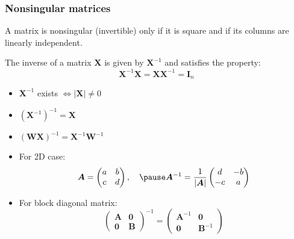 \documentclass[smaller]{beamer}
\newcommand{\?}{\stackrel{?}{=}}
\newcommand{\fr}{\frac}
\begin{document}
\begin{frame}
  \frametitle{Nonsingular matrices}
  \pause

  A matrix is nonsingular (invertible) only if it is square and if its columns are  linearly independent.

  \pause

  The inverse of a matrix $\bm X$ is given by $\bm X^{-1}$ and
  satisfies the property:\pause
 \begin{equation}
    \bm X^{-1}\bm X = \bm X \bm X^{-1} = \bm I_{n}
  \end{equation}
  
\pause

\begin{itemize}
\item $\bm X^{-1}$ exists $\iff |\bm X| \ne 0$ \pause
\item $(\bm X^{-1})^{-1} = \bm X$ \pause
\item $(\bm W\bm X)^{-1} = \bm X^{-1}\bm W^{-1}$ \pause
\item For 2D case:\pause
  \begin{equation}
    \bm A =
    \begin{pmatrix}
      a & b\\ c& d
    \end{pmatrix},\quad\pause \bm{A}^{-1} = \fr1{|\bm A|}
    \begin{pmatrix}
      d & -b \\ -c & a
    \end{pmatrix}
  \end{equation}

\pause
\item For block diagonal matrix:\pause
  \begin{equation}
    \begin{pmatrix}
      \bm A & \bm 0 \\ \bm 0 & \bm B
    \end{pmatrix}^{-1}
 =
 \begin{pmatrix}
   \bm A^{-1} & \bm 0 \\ \bm 0 & \bm B^{-1}
 \end{pmatrix}
  \end{equation}

\end{itemize}
\end{frame}
\end{document}
